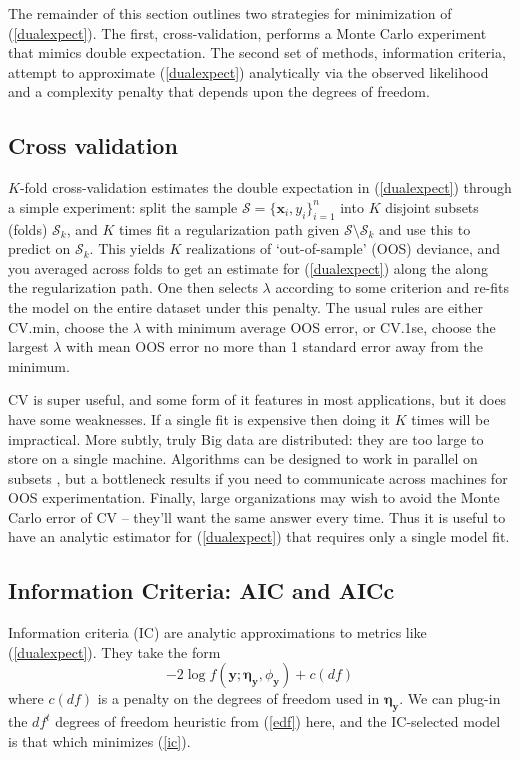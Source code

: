 \documentclass[12pt]{article}
\newcommand{\bs}[1]{\boldsymbol{#1}}
\newcommand{\mc}[1]{\mathcal{#1}}
\newcommand{\bm}[1]{\mathbf{#1}}
\begin{document}
The remainder of this section outlines two strategies for minimization of (\ref{dualexpect}).  The first, cross-validation, performs a Monte Carlo experiment that mimics double expectation.  The second set of methods, information criteria, attempt to approximate (\ref{dualexpect}) analytically via the observed likelihood and a complexity penalty that depends upon the degrees of freedom.

\subsection{Cross validation}
\label{cv}

$K$-fold cross-validation \cite[CV; see][for an
overview]{efron_estimation_2004} estimates the double expectation in
(\ref{dualexpect}) through a simple experiment: split the sample $\mc{S} =
\{\bm{x}_i,y_i\}_{i=1}^n$ into $K$  disjoint subsets (folds) $\mc{S}_k$,
and $K$ times fit a regularization path given $\mc{S} \setminus \mc{S}_k$ and
use this to predict on $\mc{S}_k$.  This yields $K$  realizations of
`out-of-sample' (OOS) deviance, and you averaged across folds to get an
estimate for (\ref{dualexpect}) along the along the regularization path. One then selects $\lambda$ according to some criterion and re-fits the
model on the entire dataset under this penalty.  The usual rules are either
CV.min, choose the $\lambda$ with minimum average OOS error, or
CV.1se, choose the largest $\lambda$ with mean OOS error no more than
1 standard error away from the minimum. 

CV is super useful, and some form of it features in most applications, but it
does have some weaknesses. If a single fit is expensive then doing it $K$
times will be impractical.  More subtly, truly Big data are distributed: they
are too large to store on a single machine. Algorithms can be designed to work
in parallel on subsets
\citep[e.g.,][]{taddy_distributed_2013}, but a bottleneck
results if you need to communicate across machines for OOS experimentation.
Finally, large organizations may wish to avoid the
Monte Carlo error of CV -- they'll want the same answer every time.  Thus it
is useful to have an analytic estimator for (\ref{dualexpect}) that requires only  a single model fit.


\subsection{Information Criteria: AIC and AICc}


Information criteria (IC) are analytic approximations to metrics like (\ref{dualexpect}).  They take the form
\begin{equation}\label{ic}
 -2\log f(\bm{y}; \bs{\eta}_{\bm{y}},\phi_{\bm{y}}) + c(df)
 \end{equation} 
where $c(df)$ is a penalty on the degrees of freedom used in $\bs{\eta}_{\bm{y}}$.
 We can plug-in the $df^t$ degrees of
freedom heuristic from (\ref{edf}) here, and the IC-selected model is that
which minimizes (\ref{ic}).
\end{document}
